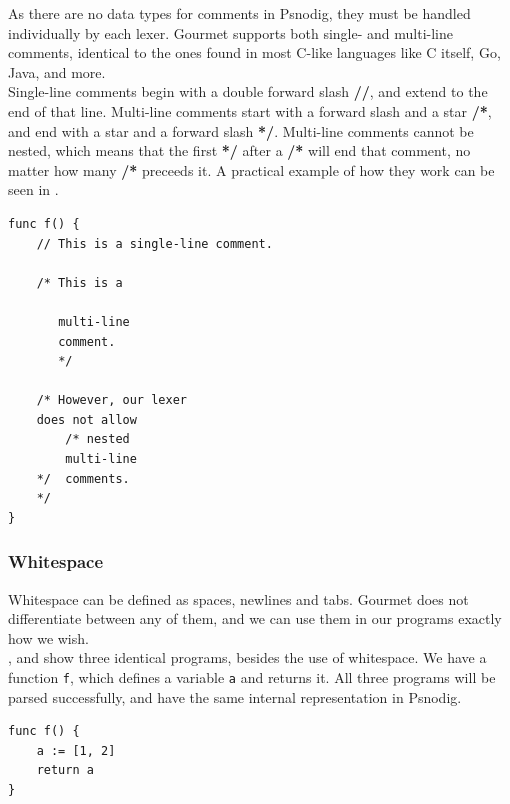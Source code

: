 As there are no data types for comments in Psnodig, they must be handled individually by each lexer. Gourmet supports both single- and multi-line comments, identical to the ones found in most C-like languages like C itself, Go, Java, and more. \\

Single-line comments begin with a double forward slash \textbf{//}, and extend to the end of that line. Multi-line comments start with a forward slash and a star \textbf{/*}, and end with a star and a forward slash \textbf{*/}. Multi-line comments cannot be nested, which means that the first \textbf{*/} after a \textbf{/*} will end that comment, no matter how many \textbf{/*} preceeds it. A practical example of how they work can be seen in . \\

\begin{lstlisting}[caption={Example of legal and illegal comments in a Gourmet program.}, captionpos=b, label={Example of legal and illegal comments in Gourmet.}]
func f() {
    // This is a single-line comment.

    /* This is a

       multi-line
       comment.
       */

    /* However, our lexer
    does not allow
        /* nested
        multi-line
    */  comments.
    */
}
\end{lstlisting}

\subsubsection{Whitespace}

Whitespace can be defined as spaces, newlines and tabs. Gourmet does not differentiate between any of them, and we can use them in our programs exactly how we wish. \\

,  and  show three identical programs, besides the use of whitespace. We have a function \texttt{f}, which defines a variable \texttt{a} and returns it. All three programs will be parsed successfully, and have the same internal representation in Psnodig. \\

\begin{lstlisting}[caption={A Gourmet program with a standard amount of whitespace.}, captionpos=b, label={f with a standard amount of whitespace.}]
func f() {
    a := [1, 2]
    return a
}
\end{lstlisting}

